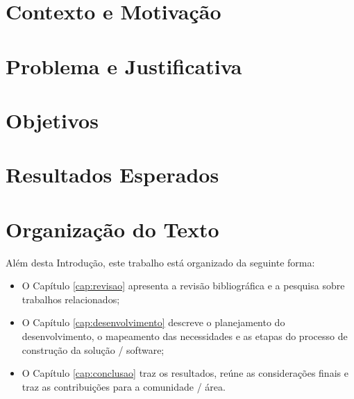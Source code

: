 \label{cap:introducao}




\section{Contexto e Motivação} \textbf{ }


\section{Problema e Justificativa}\textbf{ }



\section{Objetivos} \textbf{ } 


\section{Resultados Esperados} \label{metodo} \textbf{ }


\section{Organização do Texto}\textbf{ }
Além desta Introdução, este trabalho está organizado da seguinte forma: 

 \begin{itemize}
   \item O Capítulo \ref{cap:revisao} apresenta a revisão bibliográfica e a pesquisa sobre trabalhos relacionados;
   
   \item O Capítulo \ref{cap:desenvolvimento} descreve o planejamento do desenvolvimento, o mapeamento das necessidades e as etapas do processo de construção da solução / software;
   
   \item O Capítulo \ref{cap:conclusao} traz os resultados, reúne as considerações finais e traz as contribuições para a comunidade / área.
   
 \end{itemize}